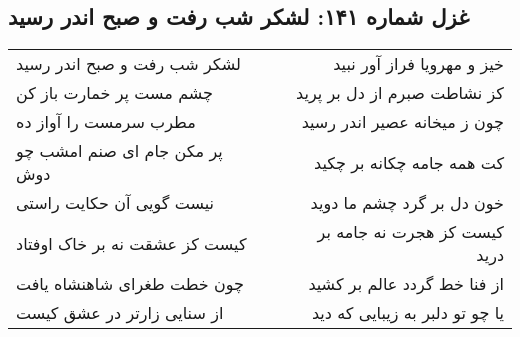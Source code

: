 \begin{center}
\section*{غزل شماره ۱۴۱: لشکر شب رفت و صبح اندر رسید}
\label{sec:141}
\begin{longtable}{l p{0.5cm} r}
لشکر شب رفت و صبح اندر رسید
&&
خیز و مهرویا فراز آور نبید
\\
چشم مست پر خمارت باز کن
&&
کز نشاطت صبرم از دل بر پرید
\\
مطرب سرمست را آواز ده
&&
چون ز میخانه عصیر اندر رسید
\\
پر مکن جام ای صنم امشب چو دوش
&&
کت همه جامه چکانه بر چکید
\\
نیست گویی آن حکایت راستی
&&
خون دل بر گرد چشم ما دوید
\\
کیست کز عشقت نه بر خاک اوفتاد
&&
کیست کز هجرت نه جامه بر درید
\\
چون خطت طغرای شاهنشاه یافت
&&
از فنا خط گردد عالم بر کشید
\\
از سنایی زارتر در عشق کیست
&&
یا چو تو دلبر به زیبایی که دید
\\
\end{longtable}
\end{center}
